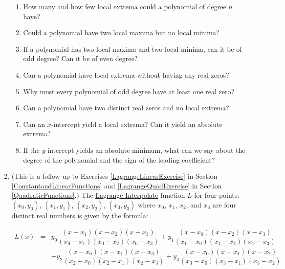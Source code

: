\begin{enumerate}
\begin{enumerate}

\item How many and how few  local extrema could a polynomial of degree $n$ have?  
\item Could a polynomial have two local maxima but no local minima?  
\item If a polynomial has two local maxima and two local minima, can it be of odd degree?  Can it be of even degree?
\item Can a polynomial have local extrema without having any real zeros?
\item Why must every polynomial of odd degree have at least one real zero?
\item Can a polynomial have two distinct real zeros and no local extrema?
\item Can an $x$-intercept yield a local extrema?  Can it yield an absolute extrema?
\item If the $y$-intercept yields an absolute minimum, what can we say about the degree of the polynomial and the sign of the leading coefficient?   

\end{enumerate}

\item \label{LagrangePolyExercise} (This is a follow-up to Exercises \ref{LagrangeLinearExercise} in Section \ref{ConstantandLinearFunctions} and \ref{LagrangeQuadExercise} in Section \ref{QuadraticFunctions}.) The  \href{https://en.wikipedia.org/wiki/Lagrange_polynomial}{\underline{Lagrange Interpolate}} function $L$  for four  points:  $(x_{0}, y_{0})$, $(x_{1}, y_{1})$,  $(x_{2}, y_{2})$,   $(x_{3}, y_{3})$ where $x_{0}$,  $x_{1}$, $x_{2}$, and $x_{3}$ are four distinct real numbers is given by the formula: 

 \[ \begin{array}{rcl}
 
 L(x) & = &  y_{0}  \dfrac{(x - x_{1}) (x - x_{2}) (x-x_{3})}{(x_{0} - x_{1})(x_{0} - x_{2})(x_{0} - x_{3})}+ y_{1}  \dfrac{(x - x_{0}) (x - x_{2}) (x-x_{3})}{(x_{1} - x_{0})(x_{1} - x_{2})(x_{1} - x_{3})} \\ [15pt]
         &&  +y_{2}  \dfrac{(x - x_{0}) (x - x_{1}) (x-x_{3})}{(x_{2} - x_{0})(x_{2} - x_{1})(x_{2} - x_{3})}+ y_{3}  \dfrac{(x - x_{0}) (x - x_{1}) (x-x_{2})}{(x_{3} - x_{0})(x_{3} - x_{1})(x_{3} - x_{2})} \\ \end{array}\]

\begin{enumerate}


\end{enumerate}
\end{enumerate}
